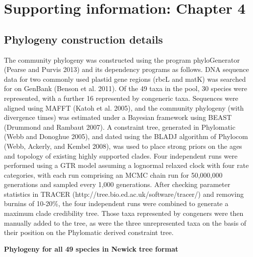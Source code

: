 
\chapter{Supporting information: Chapter 4} 

\graphicspath{{Appendix3/Figs/}}

\section{Phylogeny construction details}

The community phylogeny was constructed using the program phyloGenerator (Pearse and Purvis 2013) and its dependency programs as follows. DNA sequence data for two commonly used plastid gene regions (rbcL and matK) was searched for on GenBank (Benson et al. 2011). Of the 49 taxa in the pool, 30 species were represented, with a further 16 represented by congeneric taxa. Sequences were aligned using MAFFT (Katoh et al. 2005), and the community phylogeny (with divergence times) was estimated under a Bayesian framework using BEAST (Drummond and Rambaut 2007). A constraint tree, generated in Phylomatic (Webb and Donoghue 2005), and dated using the BLADJ algorithm of Phylocom (Webb, Ackerly, and Kembel 2008), was used to place strong priors on the ages and topology of existing highly supported clades. Four independent runs were performed using a GTR model assuming a lognormal relaxed clock with four rate categories, with each run comprising an MCMC chain run for 50,000,000 generations and sampled every 1,000 generations. After checking parameter statistics in TRACER (http://tree.bio.ed.ac.uk/software/tracer/) and removing burnins of 10-20\%, the four independent runs were combined to generate a maximum clade credibility tree. Those taxa represented by congeners were then manually added to the tree, as were the three unrepresented taxa on the basis of their position on the Phylomatic derived constraint tree. 

\newpage

\textbf{Phylogeny for all 49 species in Newick tree format}

